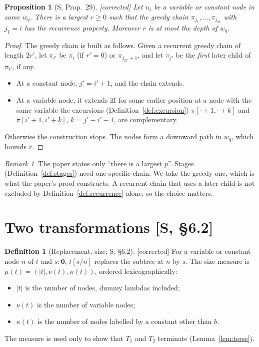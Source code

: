 \documentclass[11pt]{article}
\newcommand{\Ground}{\mathbf{0}}
\newcommand{\iv}[2]{\pi[#1,#2]}
\newcommand{\Fixed}{\textsf{[corrected]}}
\theoremstyle{plain}
\newtheorem{proposition}[theorem]{Proposition}
\theoremstyle{definition}
\newtheorem{definition}[theorem]{Definition}
\theoremstyle{remark}
\newtheorem{remark}[theorem]{Remark}
\begin{document}
\begin{proposition}[S, Prop.~29]\label{prop:29}
\Fixed{} Let $n_i$ be a variable or constant node in some $w_q$.  There
is a largest $r\ge0$ such that the \emph{greedy} chain
$\pi_{j_1},\dots,\pi_{j_{2r}}$ with $j_1=i$ has the recurrence property.
Moreover $r$ is at most the depth of $w_q$.
\end{proposition}
\begin{proof}
The greedy chain is built as follows.  Given a recurrent greedy chain of
length $2r'$, let $\pi_{i'}$ be $\pi_i$ (if $r'=0$) or
$\pi_{j_{2r'}+1}$, and let $\pi_{j'}$ be the \emph{first} later child of
$\pi_{i'}$, if any.
\begin{itemize}
\item At a constant node, $j'=i'+1$, and the chain extends.
\item At a variable node, it extends iff for some earlier position at a
  node with the same variable the excursions (Definition~\ref{def:excursion}) $\iv{\cdot+1}{\cdot+k}$ and
  $\iv{i'+1}{i'+k}$, $k=j'-i'-1$, are complementary.
\end{itemize}
Otherwise the construction stops.  The nodes form a downward path in
$w_q$, which bounds $r$.
\end{proof}

\begin{remark}
The paper states only ``there is a largest $p$''.  Stages
(Definition~\ref{def:stages}) need one specific chain.  We take the
greedy one, which is what the paper's proof constructs.  A recurrent
chain that uses a later child is not excluded by Definition~\ref{def:recurrence}
alone, so the choice matters.
\end{remark}

\section{Two transformations [S, \S6.2]}\label{sec:transformations}

\begin{definition}[Replacement, size; S, \S6.2]
\Fixed{} For a variable or constant node $n$ of $t$ and $s:\Ground$,
$t[s/n]$ replaces the subtree at $n$ by $s$.  The size measure is
$\mu(t)=(|t|,\nu(t),\kappa(t))$, ordered lexicographically:
\begin{itemize}
\item $|t|$ is the number of nodes, dummy lambdas included;
\item $\nu(t)$ is the number of variable nodes;
\item $\kappa(t)$ is the number of nodes labelled by a constant other
  than $b$.
\end{itemize}
The measure is used only to show that $T_1$ and $T_2$ terminate
(Lemma~\ref{lem:terse}).
\end{definition}
\end{document}
